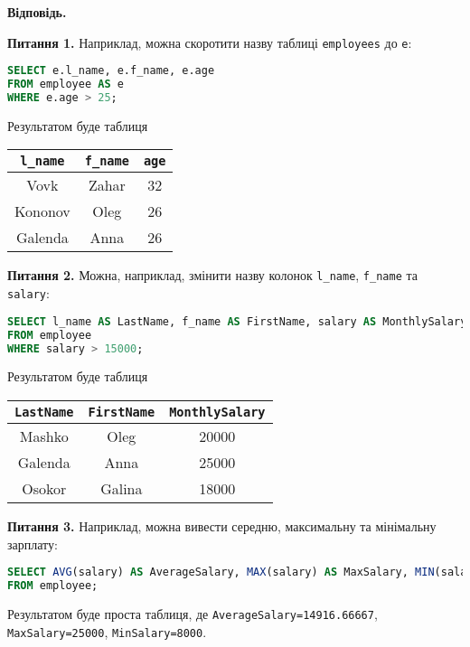 \documentclass{hw_template}
\begin{document}
\textbf{Відповідь.}

\textbf{Питання 1.} Наприклад, можна скоротити назву таблиці \texttt{employees} до \texttt{e}:
\begin{lstlisting}[language=SQL]
SELECT e.l_name, e.f_name, e.age
FROM employee AS e
WHERE e.age > 25;
\end{lstlisting}

Результатом буде таблиця
\begin{table}[H]
    \centering
    \begin{tabular}{|c|c|c|}
        \hline
        \texttt{l\_name} & \texttt{f\_name} & \texttt{age} \\
        \hline
        Vovk & Zahar & 32 \\
        Kononov & Oleg & 26 \\
        Galenda	& Anna & 26 \\
        \hline
    \end{tabular}
\end{table}

\textbf{Питання 2.} Можна, наприклад, змінити назву колонок \texttt{l\_name}, \texttt{f\_name} та \texttt{salary}:
\begin{lstlisting}[language=SQL]
SELECT l_name AS LastName, f_name AS FirstName, salary AS MonthlySalary
FROM employee
WHERE salary > 15000;
\end{lstlisting}

Результатом буде таблиця
\begin{table}[H]
    \centering
    \begin{tabular}{|c|c|c|}
        \hline
        \texttt{LastName} & \texttt{FirstName} & \texttt{MonthlySalary} \\
        \hline
        Mashko & Oleg & 20000 \\
        Galenda & Anna & 25000 \\
        Osokor & Galina & 18000 \\
        \hline
    \end{tabular}
\end{table}

\textbf{Питання 3.} Наприклад, можна вивести середню, максимальну та мінімальну зарплату:
\begin{lstlisting}[language=SQL]
SELECT AVG(salary) AS AverageSalary, MAX(salary) AS MaxSalary, MIN(salary) AS MinSalary
FROM employee;
\end{lstlisting}

Результатом буде проста таблиця, де \texttt{AverageSalary=14916.66667}, \texttt{MaxSalary=25000}, \texttt{MinSalary=8000}.
\end{document}
